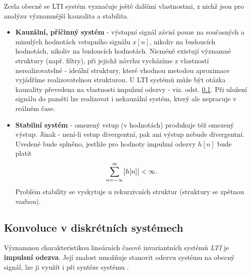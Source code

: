      Zcela obecně se LTI systém vyznačuje ještě dalšími vlastnostmi, z nichž jsou pro analýzu
      významnější kauzalita a stabilita. 
      \begin{itemize}
        \item \textbf{Kauzální, příčinný systém} - výstupní signál závisí pouze na současných a
              minulých hodnotách vstupního signálu \(x[n]\), nikoliv na budoucích hodnotách, nikoliv
              na budoucích hodnotách. Nicméně existují významné struktury (např. filtry), při
              jejichž návrhu vycházíme z vlastností nerealizovatelné - ideální struktury, které
              vhodnou metodou aproximace vyjádříme realizovatelnou strukturou. U LTI systémů může
              být otázka kauzality převedena na vlastnosti impulzní odezvy - viz. odst.
              \ref{tky:IchIIsecIssecII}. Při uložení signálu do paměti lze realizovat i nekauzální
              systém, který ale nepracuje v reálném čase. 
        \item \textbf{Stabilní systém} - omezený vstup (v hodnotách) produkuje též omezený výstup.
              Jinak - není-li vstup divergentní, pak ani výstup nebude divergentní. Uvedené bude
              splněno, jestliže pro hodnoty impulzní odezvy \(h[n]\) bude platit
              \begin{equation*}
                \sum_{n=-\infty}^\infty\abs{h[n]} <\infty.
              \end{equation*}
              Problém stability se vyskytuje u rekurzivních struktur (struktury se zpětnou vazbou). 
      \end{itemize}
      

    \subsection{Konvoluce v diskrétních systémech}\label{tky:IchIIsecIssecII}
      Významnou charakteristikou lineárních časově invariantních systémů \emph{LTI} je
      \textbf{impulsní odezva}. Její znalost umožňuje stanovit odezvu systému na obecný signál, lze 
      ji využít i při syntéze systému \cite{Bicak2007}.

